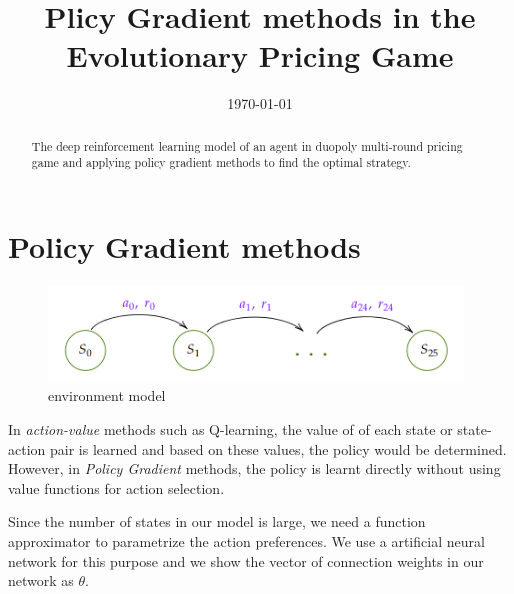 \documentclass[a4paper,12pt]{article}  %
\title{%
	Plicy Gradient methods in the Evolutionary Pricing Game
}
\author{
}
\date{\today
	\\[1ex]
}
\theoremstyle{definition}
\begin{document}
	\maketitle
	
	\begin{abstract}
		The deep reinforcement learning model of an agent in duopoly multi-round pricing game and applying policy gradient methods to find the optimal strategy. 
		
	\end{abstract}
	
	\section{Policy Gradient methods}
	
	
	
	\begin{figure}[hbt]
		\centering
		\includegraphics[width=11cm]{states_model}
		\caption{environment model}
		\label{f1equi}
	\end{figure}
	
	In \textit{action-value} methods such as Q-learning, the value of of each state or state-action pair is learned and based on these values, the policy would be determined.
	However, in \textit{Policy Gradient} methods, the policy is learnt directly without using value functions for action selection.
	
	
	Since the number of states in our model is large, we need a function approximator to parametrize the action preferences. We use a artificial neural network for this purpose and we show the vector of connection weights in our network as $ \theta $.
	
\end{document}
